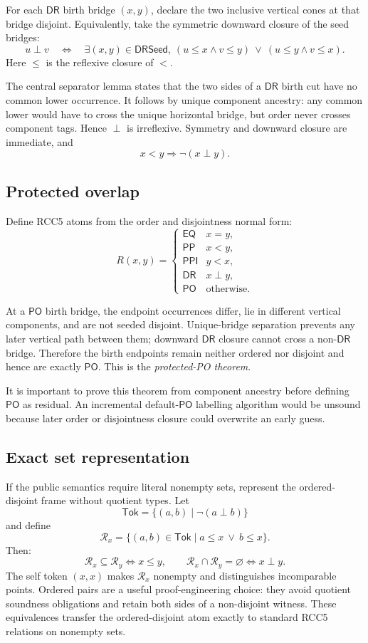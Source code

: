 \documentclass[11pt]{article}
\newcommand{\PP}{\mathsf{PP}}
\newcommand{\PPI}{\mathsf{PPI}}
\newcommand{\PO}{\mathsf{PO}}
\newcommand{\DR}{\mathsf{DR}}
\newcommand{\EQ}{\mathsf{EQ}}
\begin{document}
For each $\DR$ birth bridge $(x,y)$, declare the two inclusive vertical cones at that
bridge disjoint. Equivalently, take the symmetric downward closure of the seed bridges:
\[
  u\perp v
  \quad\Longleftrightarrow\quad
  \exists(x,y)\in\mathsf{DRSeed},\
  (u\leq x\wedge v\leq y)\ \vee\
  (u\leq y\wedge v\leq x).
\]
Here $\leq$ is the reflexive closure of $<$.

The central separator lemma states that the two sides of a $\DR$ birth cut have no common
lower occurrence. It follows by unique component ancestry: any common lower would have
to cross the unique horizontal bridge, but order never crosses component tags. Hence
$\perp$ is irreflexive. Symmetry and downward closure are immediate, and
\[
  x<y\Longrightarrow \neg(x\perp y).
\]

\subsection{Protected overlap}

Define RCC5 atoms from the order and disjointness normal form:
\[
  R(x,y)=
  \begin{cases}
  \EQ & x=y,\\
  \PP & x<y,\\
  \PPI & y<x,\\
  \DR & x\perp y,\\
  \PO & \text{otherwise.}
  \end{cases}
\]

At a $\PO$ birth bridge, the endpoint occurrences differ, lie in different vertical
components, and are not seeded disjoint. Unique-bridge separation prevents any later
vertical path between them; downward $\DR$ closure cannot cross a non-$\DR$ bridge.
Therefore the birth endpoints remain neither ordered nor disjoint and hence are exactly
$\PO$. This is the \emph{protected-PO theorem}.

It is important to prove this theorem from component ancestry before defining $\PO$ as
residual. An incremental default-$\PO$ labelling algorithm would be unsound because later
order or disjointness closure could overwrite an early guess.

\subsection{Exact set representation}\label{sec:tokens}

If the public semantics require literal nonempty sets, represent the ordered-disjoint
frame without quotient types. Let
\[
  \mathsf{Tok}=\{(a,b)\mid \neg(a\perp b)\}
\]
and define
\[
  \mathcal{R}_x
  =\{(a,b)\in\mathsf{Tok}\mid a\leq x\ \vee\ b\leq x\}.
\]
Then:
\[
  \mathcal{R}_x\subseteq\mathcal{R}_y\Longleftrightarrow x\leq y,
  \qquad
  \mathcal{R}_x\cap\mathcal{R}_y=\varnothing\Longleftrightarrow x\perp y.
\]
The self token $(x,x)$ makes $\mathcal{R}_x$ nonempty and distinguishes incomparable
points. Ordered pairs are a useful proof-engineering choice: they avoid quotient
soundness obligations and retain both sides of a non-disjoint witness. These equivalences
transfer the ordered-disjoint atom exactly to standard RCC5 relations on nonempty sets.
\end{document}
